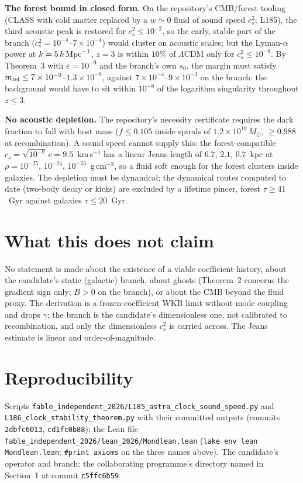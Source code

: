 \documentclass[11pt,letterpaper]{article}
\begin{document}
\textbf{The forest bound in closed form.} On the repository's CMB/forest tooling (CLASS with cold matter replaced by a $w\simeq0$ fluid of sound speed $c_s^2$; L185), the third acoustic peak is restored for $c_s^2\le10^{-2}$, so the early, stable part of the branch ($c_s^2=10^{-4}$--$7\times10^{-4}$) would cluster on acoustic scales; but the Lyman-$\alpha$ power at $k=5\,h\,{\rm Mpc}^{-1}$, $z=3$ is within $10\%$ of $\Lambda$CDM only for $c_s^2\le10^{-9}$. By Theorem~3 with $\varepsilon=10^{-9}$ and the branch's own $s_0$, the margin must satisfy $m_{\rm rel}\le7\times10^{-9}$--$1.3\times10^{-8}$, against $7\times10^{-4}$--$9\times10^{-3}$ on the branch: the background would have to sit within $10^{-8}$ of the logarithm singularity throughout $z\le3$.

\textbf{No acoustic depletion.} The repository's necessity certificate requires the dark fraction to fall with host mass ($f\le0.105$ inside spirals of $1.2\times10^{10}\,M_\odot$, $\ge0.988$ at recombination). A sound speed cannot supply this: the forest-compatible $c_s=\sqrt{10^{-9}}\,c=9.5$~km\,s$^{-1}$ has a linear Jeans length of $6.7$, $2.1$, $0.7$~kpc at $\rho=10^{-25}$, $10^{-24}$, $10^{-23}$~g\,cm$^{-3}$, so a fluid soft enough for the forest clusters inside galaxies. The depletion must be dynamical; the dynamical routes computed to date (two-body decay or kicks) are excluded by a lifetime pincer, forest $\tau\ge41$~Gyr against galaxies $\tau\le20$~Gyr.

\section{What this does not claim}
No statement is made about the existence of a viable coefficient history, about the candidate's static (galactic) branch, about ghosts (Theorem~2 concerns the gradient sign only; $B>0$ on the branch), or about the CMB beyond the fluid proxy. The derivation is a frozen-coefficient WKB limit without mode coupling and drops $\gamma$; the branch is the candidate's dimensionless one, not calibrated to recombination, and only the dimensionless $c_s^2$ is carried across. The Jeans estimate is linear and order-of-magnitude.

\section{Reproducibility}
Scripts \texttt{fable\_independent\_2026/L185\_astra\_clock\_sound\_speed.py} and \texttt{L186\_clock\_stability\_theorem.py} with their committed outputs (commits \texttt{2dbfc6013}, \texttt{cd1fc0b88}); the Lean file \texttt{fable\_independent\_2026/lean\_2026/Mondlean.lean} (\texttt{lake env lean Mondlean.lean}; \texttt{\#print axioms} on the three names above). The candidate's operator and branch: the collaborating programme's directory named in Section~1 at commit \texttt{c5ffc6b59}.
\end{document}
